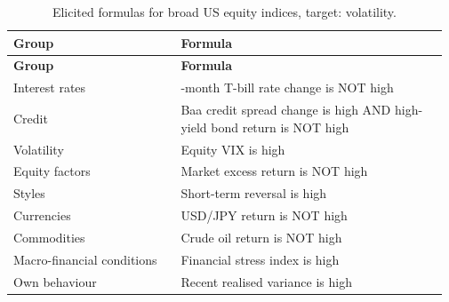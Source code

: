 {\small\setlength{\tabcolsep}{4pt}\renewcommand{\arraystretch}{1.2}
\begin{longtable}{@{}>{\raggedright\arraybackslash}p{0.372\linewidth}>{\raggedright\arraybackslash}p{0.597\linewidth}@{}}
\caption{Elicited formulas for broad US equity indices, target: volatility.}\label{tab:1}\\
\toprule
\textbf{Group} & \textbf{Formula} \\
\midrule
\endfirsthead
\toprule
\textbf{Group} & \textbf{Formula} \\
\midrule
\endhead
\bottomrule
\endlastfoot
Interest rates & 3-month T-bill rate change is NOT high \\
Credit & Baa credit spread change is high AND high-yield bond return is NOT high \\
Volatility & Equity VIX is high \\
Equity factors & Market excess return is NOT high \\
Styles & Short-term reversal is high \\
Currencies & USD/JPY return is NOT high \\
Commodities & Crude oil return is NOT high \\
Macro-financial conditions & Financial stress index is high \\
Own behaviour & Recent realised variance is high \\
\end{longtable}}
